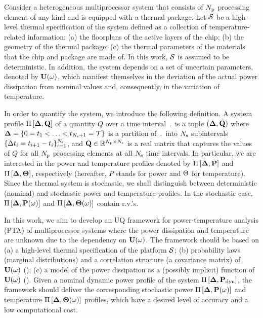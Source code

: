 Consider a heterogeneous multiprocessor system that consists of ${N_\text{p}}$ processing element of any kind and is equipped with a thermal package. Let $\mathcal{S}$ be a high-level thermal specification of the system defined as a collection of temperature-related information: (a) the floorplans of the active layers of the chip; (b) the geometry of the thermal package; (c) the thermal parameters of the materials that the chip and package are made of. In this work, $\mathcal{S}$ is assumed to be deterministic. In addition, the system depends on a set of uncertain parameters, denoted by $\mathbf{U}(\omega)$, which manifest themselves in the deviation of the actual power dissipation from nominal values and, consequently, in the variation of temperature.

In order to quantify the system, we introduce the following definition. A system profile $\prof{\m{Q}}$ of a quantity $Q$ over a time interval $\period$ is a tuple $(\part, \m{Q})$ where $\boldsymbol{\Delta} = \{ 0 = t_1 < \dotsc < t_{N_\text{s} + 1} = \mathcal{T} \}$ is a partition of $\period$ into $N_\text{s}$ subintervals $\{ \Delta t_i = t_{i+1} - t_i \}_{i = 1}^{N_\text{s}}$, and $\m{Q} \in \real^{\cores \times \steps}$ is a real matrix that captures the values of $Q$ for all ${N_\text{p}}$ processing elements at all $N_\text{s}$ time intervals. In particular, we are interested in the power and temperature profiles denoted by $\prof{\mP}$ and $\Pi\left[\boldsymbol{\Delta}, {\boldsymbol\Theta}\right]$, respectively (hereafter, $P$ stands for power and $\Theta$ for temperature). Since the thermal system is stochastic, we shall distinguish between deterministic (nominal) and stochastic power and temperature profiles. In the stochastic case, $\prof{\mP(\o)}$ and $\Pi\left[\boldsymbol{\Delta}, {\boldsymbol\Theta}(\omega)\right]$ contain r.v.'s.

In this work, we aim to develop an UQ framework for power-temperature analysis (PTA) of multiprocessor systems where the power dissipation and temperature are unknown due to the dependency on $\mathbf{U}(\omega)$. The framework should be based on (a) a high-level thermal specification of the platform $\mathcal{S}$; (b) probability laws (marginal distributions) and a correlation structure (a covariance matrix) of $\mathbf{U}(\omega)$ (); (c) a model of the power dissipation as a (possibly implicit) function of $\mathbf{U}(\omega)$ (). Given a nominal dynamic power profile of the system $\prof{\mP_\dyn}$, the framework should deliver the corresponding stochastic power $\Pi\left[\boldsymbol{\Delta}, \mathbf{P}(\omega)\right]$ and temperature $\Pi\left[\boldsymbol{\Delta}, {\boldsymbol\Theta}(\omega)\right]$ profiles, which have a desired level of accuracy and a low computational cost.

